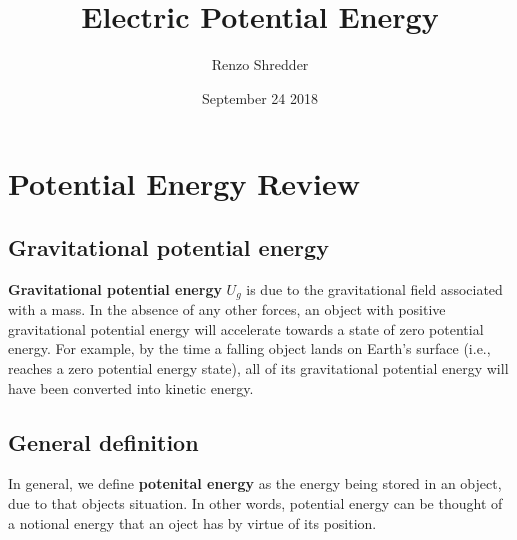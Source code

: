 \documentclass[a4paper]{article}
\title{Electric Potential Energy}
\author{Renzo Shredder}
\date{September 24 2018}
\begin{document}
\maketitle
\section*{Potential Energy Review}
\subsection*{Gravitational potential energy}
\textbf{Gravitational potential energy} $U_g$ is due to the gravitational field associated with a mass. In the absence of any other forces, an object with positive gravitational potential energy will accelerate towards a state of zero potential energy. For example, by the time a falling object lands on Earth's surface (i.e., reaches a zero potential energy state), all of its gravitational potential energy will have been converted into kinetic energy. 
\subsection*{General definition}
In general, we define \textbf{potenital energy} as the energy being stored in an object, due to that objects situation. In other words, potential energy can be thought of a notional energy that an oject has by virtue of its position.
\end{document}
